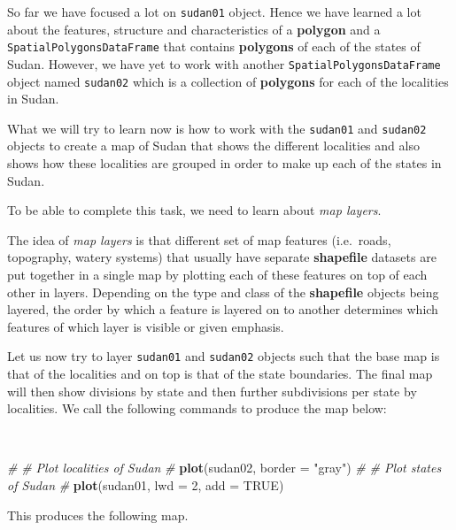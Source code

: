 \documentclass[12pt,a4paper,a4paper]{book}
\newenvironment{Shaded}{\begin{snugshade}}{\end{snugshade}}
\newcommand{\KeywordTok}[1]{\textcolor[rgb]{0.13,0.29,0.53}{\textbf{#1}}}
\newcommand{\DataTypeTok}[1]{\textcolor[rgb]{0.13,0.29,0.53}{#1}}
\newcommand{\DecValTok}[1]{\textcolor[rgb]{0.00,0.00,0.81}{#1}}
\newcommand{\StringTok}[1]{\textcolor[rgb]{0.31,0.60,0.02}{#1}}
\newcommand{\CommentTok}[1]{\textcolor[rgb]{0.56,0.35,0.01}{\textit{#1}}}
\newcommand{\OtherTok}[1]{\textcolor[rgb]{0.56,0.35,0.01}{#1}}
\newcommand{\NormalTok}[1]{#1}
\theoremstyle{definition}
\theoremstyle{definition}
\theoremstyle{definition}
\theoremstyle{remark}
\begin{document}
So far we have focused a lot on \texttt{sudan01} object. Hence we have
learned a lot about the features, structure and characteristics of a
\textbf{polygon} and a \texttt{SpatialPolygonsDataFrame} that contains
\textbf{polygons} of each of the states of Sudan. However, we have yet
to work with another \texttt{SpatialPolygonsDataFrame} object named
\texttt{sudan02} which is a collection of \textbf{polygons} for each of
the localities in Sudan.

What we will try to learn now is how to work with the \texttt{sudan01}
and \texttt{sudan02} objects to create a map of Sudan that shows the
different localities and also shows how these localities are grouped in
order to make up each of the states in Sudan.

To be able to complete this task, we need to learn about \emph{map
layers}.

The idea of \emph{map layers} is that different set of map features
(i.e.~roads, topography, watery systems) that usually have separate
\textbf{shapefile} datasets are put together in a single map by plotting
each of these features on top of each other in layers. Depending on the
type and class of the \textbf{shapefile} objects being layered, the
order by which a feature is layered on to another determines which
features of which layer is visible or given emphasis.

Let us now try to layer \texttt{sudan01} and \texttt{sudan02} objects
such that the base map is that of the localities and on top is that of
the state boundaries. The final map will then show divisions by state
and then further subdivisions per state by localities. We call the
following commands to produce the map below:

~

\begin{Shaded}
\begin{Highlighting}[]
\CommentTok{#}
\CommentTok{# Plot localities of Sudan}
\CommentTok{#}
\KeywordTok{plot}\NormalTok{(sudan02, }\DataTypeTok{border =} \StringTok{"gray"}\NormalTok{)}
\CommentTok{#}
\CommentTok{# Plot states of Sudan}
\CommentTok{#}
\KeywordTok{plot}\NormalTok{(sudan01, }\DataTypeTok{lwd =} \DecValTok{2}\NormalTok{, }\DataTypeTok{add =} \OtherTok{TRUE}\NormalTok{)}
\end{Highlighting}
\end{Shaded}

\newpage

This produces the following map.

~
\end{document}
